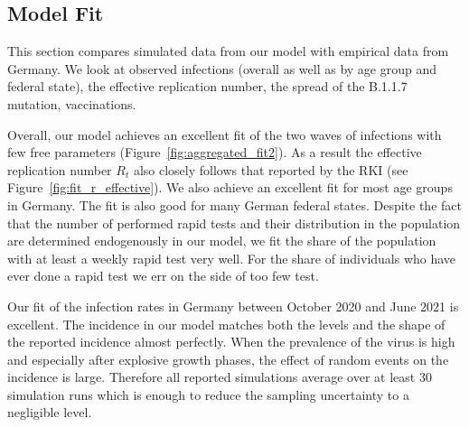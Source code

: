 \subsection{Model Fit}
\label{subsec:fit_results}

This section compares simulated data from our model with empirical data from Germany. We
look at observed infections (overall as well as by age group and federal state), the
effective replication number,  the spread of the B.1.1.7 mutation,
vaccinations.

Overall, our model achieves an excellent fit of the two waves of infections with few free
parameters (Figure~\ref{fig:aggregated_fit2}). As a result the effective replication
number $R_t$ also closely follows that reported by the RKI (see
Figure~\ref{fig:fit_r_effective}). We also achieve an excellent fit for most age groups
in Germany. The fit is also good for many German federal states. Despite the fact that
the number of performed rapid tests and their distribution in the population are
determined endogenously in our model, we fit the share of the population with at least a
weekly rapid test very well. For the share of individuals who have ever done a rapid test
we err on the side of too few test.

Our fit of the infection rates in Germany between October 2020 and June 2021 is
excellent. The incidence in our model matches both the levels and the shape of the
reported incidence almost perfectly. When the prevalence of the virus is high and
especially after explosive growth phases, the effect of random events on the
incidence is large. Therefore all reported simulations average over at least 30
simulation runs which is enough to reduce the sampling uncertainty to a negligible
level.

